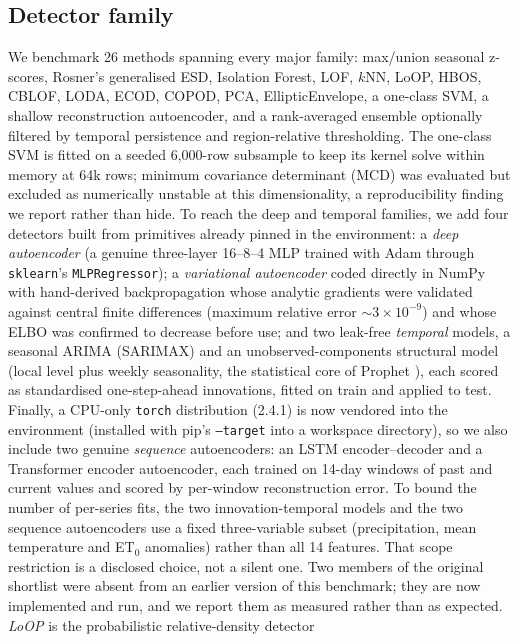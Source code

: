 \documentclass[preprint,12pt]{elsarticle}
\begin{document}
\subsection{Detector family}\label{sec:detectors}
We benchmark 26 methods spanning every major family: max/union seasonal z-scores,
Rosner's generalised ESD, Isolation Forest, LOF, $k$NN, LoOP, HBOS, CBLOF, LODA, ECOD,
COPOD, PCA, EllipticEnvelope, a one-class SVM, a shallow reconstruction
autoencoder, and a rank-averaged ensemble optionally filtered by temporal
persistence and region-relative thresholding. The one-class SVM is fitted on a
seeded 6{,}000-row subsample to keep its kernel solve within memory at 64k rows;
minimum covariance determinant (MCD) was evaluated but excluded as numerically
unstable at this dimensionality, a reproducibility finding we report rather
than hide. To reach the deep and temporal families, we add four detectors built
from primitives already pinned in the environment: a \emph{deep autoencoder} (a
genuine three-layer 16--8--4 MLP trained with Adam through \texttt{sklearn}'s
\texttt{MLPRegressor}); a \emph{variational autoencoder} coded directly in NumPy
with hand-derived backpropagation whose analytic gradients were validated against
central finite differences (maximum relative error $\sim3\times10^{-9}$) and whose
ELBO was confirmed to decrease before use; and two leak-free \emph{temporal}
models, a seasonal ARIMA (SARIMAX) and an unobserved-components structural model
(local level plus weekly seasonality, the statistical core of Prophet
\cite{taylor2018}), each scored as standardised one-step-ahead innovations,
fitted on train and applied to test. Finally, a CPU-only \texttt{torch}
distribution (2.4.1) is now
vendored into the environment (installed with pip's \texttt{--target} into a
workspace directory), so we also include two genuine \emph{sequence} autoencoders:
an LSTM encoder--decoder and a Transformer encoder autoencoder, each trained on
14-day windows of past and current values and scored by per-window reconstruction
error. To bound the number of per-series fits, the two innovation-temporal models
and the two sequence autoencoders use a fixed three-variable subset (precipitation,
mean temperature and ET$_0$ anomalies) rather than all 14 features. That scope
restriction is a disclosed choice, not a silent one. Two members of the original
shortlist were absent from an earlier version of this benchmark; they are now
implemented and run, and we report them as measured rather than as expected.
\emph{LoOP} \cite{kriegel2008} is the probabilistic relative-density detector
\end{document}
